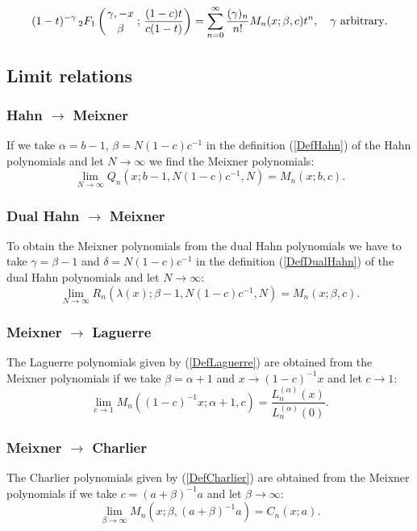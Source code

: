 \documentclass[envcountchap,graybox]{svmono}
\newcounter{rom}
\newcommand{\hyp}[5]{\mbox{}_{#1}{F}_{#2}
\left(\genfrac{}{}{0pt}{}{#3}{#4}\,;\,#5\right)}
\newcommand{\hyp}[5]{\,\mbox{}_{#1}F_{#2}\!\left(
  \genfrac{}{}{0pt}{}{#3}{#4};#5\right)}
\begin{document}
\begin{equation}
\label{GenMeixner3}
(1-t)^{-\gamma}\,\hyp{2}{1}{\gamma,-x}{\beta}{\frac{(1-c)t}{c(1-t)}}
=\sum_{n=0}^{\infty}\frac{(\gamma)_n}{n!}M_n(x;\beta,c)t^n,
\quad\textrm{$\gamma$ arbitrary}.
\end{equation}

\subsection*{Limit relations}

\subsubsection*{Hahn $\rightarrow$ Meixner}
If we take $\alpha=b-1$, $\beta=N(1-c)c^{-1}$ in the definition (\ref{DefHahn})
of the Hahn polynomials and let $N\rightarrow\infty$ we find the Meixner polynomials:
$$\lim_{N\rightarrow\infty}
Q_n(x;b-1,N(1-c)c^{-1},N)=M_n(x;b,c).$$

\subsubsection*{Dual Hahn $\rightarrow$ Meixner}
To obtain the Meixner polynomials from the dual Hahn polynomials we have to take
$\gamma=\beta-1$ and $\delta=N(1-c)c^{-1}$ in the definition (\ref{DefDualHahn}) of
the dual Hahn polynomials and let $N\rightarrow\infty$:
$$\lim_{N\rightarrow\infty}
R_n(\lambda(x);\beta-1,N(1-c)c^{-1},N)=M_n(x;\beta,c).$$

\subsubsection*{Meixner $\rightarrow$ Laguerre}
The Laguerre polynomials given by (\ref{DefLaguerre}) are obtained from the Meixner polynomials
if we take $\beta=\alpha+1$ and $x\rightarrow (1-c)^{-1}x$ and let $c\rightarrow 1$:
\begin{equation}
\lim_{c\rightarrow 1}
M_n((1-c)^{-1}x;\alpha+1,c)=\frac{L_n^{(\alpha)}(x)}{L_n^{(\alpha)}(0)}.
\end{equation}

\subsubsection*{Meixner $\rightarrow$ Charlier}
The Charlier polynomials given by (\ref{DefCharlier}) are obtained from the Meixner polynomials
if we take $c=(a+\beta)^{-1}a$ and let $\beta\rightarrow\infty$:
\begin{equation}
\lim_{\beta\rightarrow\infty}
M_n(x;\beta,(a+\beta)^{-1}a)=C_n(x;a).
\end{equation}
\end{document}
